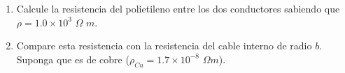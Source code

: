 \documentclass[12pt]{article}
\begin{document}
\begin{enumerate}
\begin{minipage}{12 cm}{
\begin{enumerate}
\item Calcule la resistencia del polietileno entre los dos conductores sabiendo que $\rho=1.0 \times 10^{3}$ $\Omega$ $m$.
\item Compare esta resistencia con la resistencia del cable interno de radio $b$. Suponga que es de cobre ($\rho_{Cu}=1.7 \times 10^{-8}$ $\Omega m$).
\end{enumerate}
}
\end{minipage}
%
%

\end{enumerate}
\end{document}
